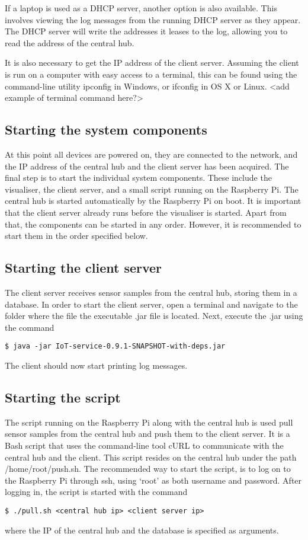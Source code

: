 \documentclass[../document.tex]{subfiles}
\begin{document}
If a laptop is used as a DHCP server, another option is also available. This involves viewing the log messages from the running DHCP server as they appear. The DHCP server will write the addresses it leases to the log, allowing you to read the address of the central hub.

It is also necessary to get the IP address of the client server. Assuming the client is run on a computer with easy access to a terminal, this can be found using the command-line utility ipconfig in Windows, or ifconfig in OS X or Linux.
{\color{red} <add example of terminal command here?>}


\subsection{Starting the system components}
At this point all devices are powered on, they are connected to the network, and the IP address of the central hub and the client server has been acquired. The final step is to start the individual system components. These include the visualiser, the client server, and a small script running on the Raspberry Pi. The central hub is started automatically by the Raspberry Pi on boot. It is important that the client server already runs before the visualiser is started. Apart from that, the components can be started in any order. However, it is recommended to start them in the order specified below.

\subsection{Starting the client server}
The client server receives sensor samples from the central hub, storing them in a database. In order to start the client server, open a terminal and navigate to the folder where the file the executable .jar file is located. Next, execute the .jar using the command
\begin{lstlisting}
$ java -jar IoT-service-0.9.1-SNAPSHOT-with-deps.jar
\end{lstlisting} The client should now start printing log messages.

\subsection{Starting the script}
The script running on the Raspberry Pi along with the central hub is used pull sensor samples from the central hub and push them to the client server. It is a Bash script that uses the command-line tool cURL to communicate with the central hub and the client. This script resides on the central hub under the path /home/root/push.sh. The recommended way to start the script, is to log on to the Raspberry Pi through ssh, using ‘root’ as both username and password. After logging in, the script is started with the command
\begin{lstlisting}
$ ./pull.sh <central hub ip> <client server ip>
\end{lstlisting}
where the IP of the central hub and the database is specified as arguments.
\end{document}
